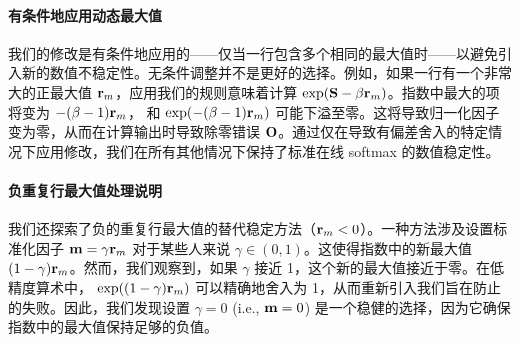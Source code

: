 \documentclass{article} %
\begin{document}
\paragraph{有条件地应用动态最大值} 我们的修改是有条件地应用的——仅当一行包含多个相同的最大值时——以避免引入新的数值不稳定性。无条件调整并不是更好的选择。例如，如果一行有一个非常大的正最大值 ${\mathbf{r}}_m$，应用我们的规则意味着计算 $\exp({\mathbf{S}} - \beta{\mathbf{r}}_m)$。指数中最大的项将变为 $-(\beta-1){\mathbf{r}}_m$， 和 $\exp(-(\beta-1){\mathbf{r}}_m)$ 可能下溢至零。这将导致归一化因子变为零，从而在计算输出时导致除零错误 ${\mathbf{O}}$。通过仅在导致有偏差舍入的特定情况下应用修改，我们在所有其他情况下保持了标准在线 softmax 的数值稳定性。


\paragraph{负重复行最大值处理说明} 我们还探索了负的重复行最大值的替代稳定方法（${\mathbf{r}}_m < 0$）。一种方法涉及设置标准化因子 ${\mathbf{m}} = \gamma {\mathbf{r}}_m$ 对于某些人来说 $\gamma \in (0, 1)$。这使得指数中的新最大值 $(1-\gamma) {\mathbf{r}}_m$。然而，我们观察到，如果 $\gamma$ 接近 1，这个新的最大值接近于零。在低精度算术中， $\exp((1-\gamma) {\mathbf{r}}_m)$ 可以精确地舍入为 1，从而重新引入我们旨在防止的失败。因此，我们发现设置 $\gamma=0$ (i.e., ${\mathbf{m}}=0$) 是一个稳健的选择，因为它确保指数中的最大值保持足够的负值。
\end{document}
